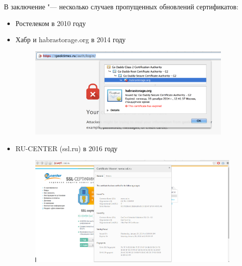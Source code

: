 \documentclass[10pt, a5paper]{article}
\begin{document}
В заключение "--- несколько случаев пропущенных обновлений сертификатов:

\begin{itemize}
  \item Ростелеком в 2010 году ~\cite{Kharkevich7}
  \item Хабр и habrastorage.org в 2014 году ~\cite{Kharkevich8} \linebreak ~ \linebreak

\begin{figure}[h!]
  \centering
  \includegraphics[width=10cm]{w_03_2016_Kharkevich12.png}
  
\end{figure}

  \item RU-CENTER (ssl.ru) в 2016 году

\begin{figure}[h!]
  \centering
  \includegraphics[height=5.5cm]{w_03_2016_Kharkevich13.png}
  
\end{figure}

\end{itemize}
\end{document}
